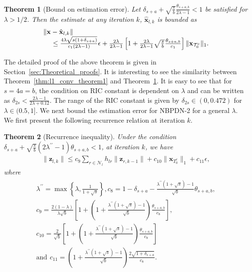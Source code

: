 \documentclass[journal]{IEEEtran}
\newcommand{\mbx}{\mathbf{x}}
\newcommand{\mbz}{\mathbf{z}}
\newcommand{\T}{\mathcal{T}}
\newtheorem{theorem}{Theorem}
\begin{document}
\begin{theorem}[Bound on estimation error]
\label{thm:l2_conv_theorem1}
Let $\delta_{s+a}+\sqrt{\frac{s}{b}}\frac{\theta_{s+a,b}}{2\lambda -1} < 1$ be satisfied for $\lambda > 1/2$. Then the estimate at any iteration $k$, $\hat{\mbx}_{l,k}$ is bounded as
\begin{eqnarray*}
\begin{array}{l}
\|\mbx-\hat{\mbx}_{l,k}\| \\ \hspace{5mm}\leq \frac{4 \lambda \sqrt{s(1+\delta_{s+a})}}{c_1(2\lambda -1)} \epsilon + \frac{2\lambda}{2\lambda -1}\left[1 + \frac{2\lambda}{2\lambda -1} \sqrt{\frac{s}{b}} \frac{\theta_{s+a,b}}{c_1}\right]\|\mbx_{\T_0^c}\|_1.
\end{array}
\end{eqnarray*}
\end{theorem}
The detailed proof of the above theorem is given in Section~\ref{sec:Theoretical_proofs}. It is interesting to see the similarity between Theorem~\ref{thm:l1_conv_theorem1} and Theorem~\ref{thm:l2_conv_theorem1}. It is easy to see that for $s =4a=b$, the condition on RIC constant is dependent on $\lambda$ and can be written as $\delta_{2s} < \frac{2\lambda-1}{2\lambda+0.12}$. The range of the RIC constant is given by $\delta_{2s} \in (0,0.472)$ for $\lambda \in (0.5,1]$. We next bound the estimation error for NBPDN-2 for a general $\lambda$. We first present the following recurrence relation at iteration $k$.
\begin{theorem}[Recurrence inequality]
\label{thm:l2_recurrence_theorem2}
Under the condition $\delta_{s+a}+\sqrt{\frac{s}{b}} (2\lambda^{\prime \prime} -1)\theta_{s+a,b} < 1$, at iteration $k$, we have
\begin{eqnarray*}
\|\mbz_{l,k}\| \leq c_9 \sum\limits_{r \in \mathcal{N}_l} h_{lr} \|\mbz_{r,k-1}\|+ c_{10} \|\mbx_{T_0^c}\|_1 + c_{11} \epsilon,
\end{eqnarray*}
where 
\begin{eqnarray*}
\begin{array}{l}
\lambda^{\prime \prime} = \max\left\{\lambda,\frac{1}{1+\sqrt{s}}\right\}, 
c_8 = 1-\delta_{s+a}-\frac{\lambda^{\prime \prime}(1+\sqrt{s})-1}{\sqrt{b}}\theta_{s+a,b}, \\
c_9 = \frac{2(1-\lambda)}{\lambda \sqrt{b}} \left[1 + \left(1+\frac{\lambda^{\prime \prime}(1+\sqrt{s})-1}{\sqrt{b}}\right)\frac{\theta_{s+a,b}}{c_8}\right], \\
c_{10} = \frac{2}{\sqrt{b}} \left[1 + \left(1+\frac{\lambda^{\prime \prime}(1+\sqrt{s})-1}{\sqrt{b}}\right)\frac{\theta_{s+a,b}}{c_8} \right] \\
\text{and}  \,\ c_{11} = \left(1+\frac{\lambda^{\prime \prime}(1+\sqrt{s})-1}{\sqrt{b}}\right)\frac{2 \sqrt{1+\delta_{s+a}}}{c_8}.
\end{array}
\end{eqnarray*}
\end{theorem}
\end{document}
